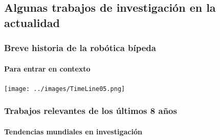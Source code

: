 {  \subsection[Investigaci\'on actual]{Algunas trabajos de investigaci\'on en la actualidad }
  \label{sec:algtra}
  \begin{frame}[label=timeline]
    \timelineTime
    \frametitle{Breve historia de la rob\'otica b\'ipeda}
    \framesubtitle{Para entrar en contexto}
    \texttt{[image: ../images/TimeLine05.png]}
  \end{frame}
  \begin{frame}[label=tendencias]
    \tendenciasTime
    \frametitle{Trabajos relevantes de los \'ultimos 8 a\~nos}
    \framesubtitle{Tendencias mundiales en investigaci\'on}
    \begin{columns}[T]
      \begin{column}{2.0cm}
      \end{column}
      \begin{column}{5.0cm}
\end{column}
\end{columns}
\end{frame}}

